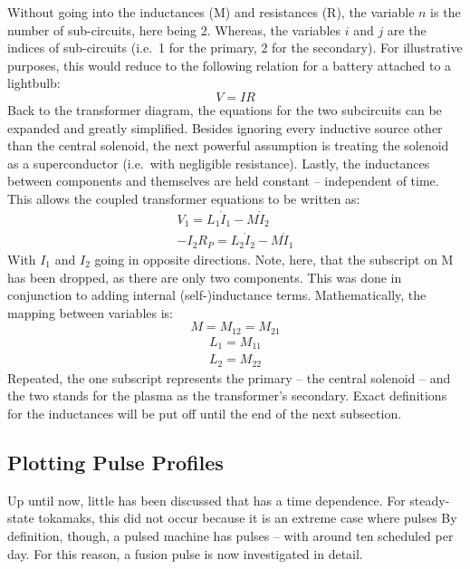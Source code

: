 Without going into the inductances (M) and resistances (R), the variable $n$ is the number of sub-circuits, here being 2. Whereas, the variables $i$ and $j$ are the indices of sub-circuits (i.e.\ 1 for the primary, 2 for the secondary). For illustrative purposes, this would reduce to the following relation for a battery attached to a lightbulb:
\begin{equation}
	V = I R
\end{equation}
Back to the transformer diagram, the equations for the two subcircuits can be expanded and greatly simplified. Besides ignoring every inductive source other than the central solenoid, the next powerful assumption is treating the solenoid as a superconductor (i.e.\ with negligible resistance). Lastly, the inductances between components and themselves are held constant -- independent of time. This allows the coupled transformer equations to be written as:
\begin{align}
	\label{eq:circ1}
	V_1 = L_1 \dot I_1 - M \dot I_2 \\
	\label{eq:circ2}
	-I_2 R_P = L_2 \dot I_2 - M \dot I_1
\end{align}
With $I_1$ and $I_2$ going in opposite directions. Note, here, that the subscript on M has been dropped, as there are only two components. This was done in conjunction to adding internal (self-)inductance terms. Mathematically, the mapping between variables is:
\begin{equation}
	M = M_{12} = M_{21}
\end{equation}
\begin{gather}
	L_1 = M_{11} \\
	L_2 = M_{22}
\end{gather}
Repeated, the one subscript represents the primary -- the central solenoid -- and the two stands for the plasma as the transformer's secondary. Exact definitions for the inductances will be put off until the end of the next subsection.

\subsection{Plotting Pulse Profiles}

Up until now, little has been discussed that has a time dependence. For steady-state tokamaks, this did not occur because it is an extreme case where pulses  By definition, though, a pulsed machine has pulses -- with around ten scheduled per day.\cite{ac_pulses} For this reason, a fusion pulse is now investigated in detail.

